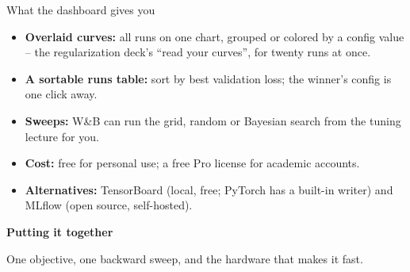 \documentclass[aspectratio=43]{beamer}
\begin{document}
\begin{frame}{What the dashboard gives you}
  \begin{itemize}\small
    \item \textbf{Overlaid curves:} all runs on one chart, grouped or colored by a config value --
      the regularization deck's ``read your curves'', for twenty runs at once.
    \item \textbf{A sortable runs table:} sort by best validation loss; the winner's config is one
      click away.
    \item \textbf{Sweeps:} W\&B can run the grid, random or Bayesian search from the tuning lecture
      for you.
    \item \textbf{Cost:} free for personal use; a free Pro license for academic accounts.
    \item \textbf{Alternatives:} TensorBoard (local, free; PyTorch has a built-in writer) and
      MLflow (open source, self-hosted).
  \end{itemize}
  \vfill
\end{frame}

\begin{frame}[plain]
  \vfill
  \begin{center}
    {\Large\color{popblue}\textbf{Putting it together}}\\[0.9em]
    \begin{minipage}{0.82\textwidth}\centering\small
      One objective, one backward sweep, and the hardware that makes it fast.
    \end{minipage}
  \end{center}
  \vfill
\end{frame}
\end{document}
